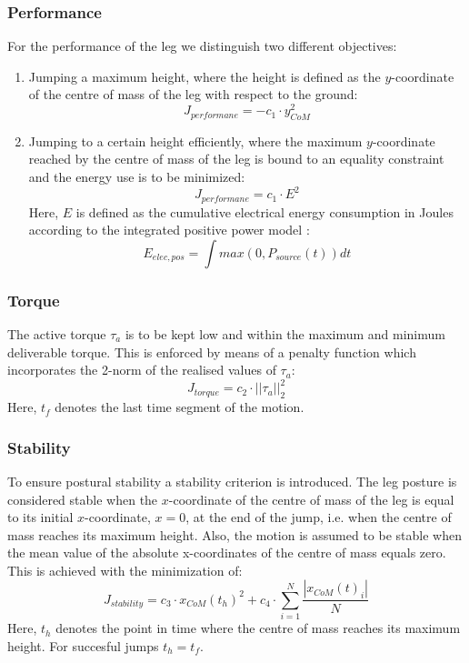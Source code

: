 \documentclass[letterpaper, 10 pt, conference]{ieeeconf}  %
\begin{document}
\subsubsection{Performance}
For the performance of the leg we distinguish two different objectives: 
\begin{enumerate}
	\item Jumping a maximum height, where the height is defined as the $y$-coordinate of the centre of mass of the leg with respect to the ground:
 \begin{equation}
	J_{performane} = -c_1 \cdot y_{CoM}^2
 \end{equation}
	\item Jumping to a certain height efficiently, where the maximum $y$-coordinate reached by the centre of mass of the leg is bound to an equality constraint and the energy use is to be minimized:
 \begin{equation}
	J_{performane} =  c_1 \cdot E^2
 \end{equation}
	Here, $E$ is defined as the cumulative electrical energy consumption in Joules according to the integrated positive power model \cite{verstraten2016energy}:
	 \begin{equation}
	E_{elec,pos} = \int max(0,P_{source}(t))dt
	\end{equation}
\end{enumerate}

\subsubsection{Torque}
The active torque $\tau_a$ is to be kept low and within the maximum and minimum deliverable torque. This is enforced by means of a penalty function which incorporates the 2-norm of the realised values of $\tau_a$:  
 \begin{equation}
J_{torque}= c_2 \cdot || \tau_a ||_2^2
 \end{equation}
Here, $t_f$ denotes the last time segment of the motion.\\

\subsubsection{Stability}
To ensure postural stability a stability criterion is introduced. The leg posture is considered stable when the $x$-coordinate of the centre of mass of the leg is equal to its initial $x$-coordinate, $x=0$, at the end of the jump, i.e. when the centre of mass reaches its maximum height. Also, the motion is assumed to be stable when the mean value of the absolute x-coordinates of the centre of mass equals zero. This is achieved with the minimization of:
 \begin{equation}
J_{stability}  = c_3\cdot x_{CoM}(t_h)^2 + c_4\cdot  \sum^{N}_{i=1}\frac{| x_{CoM}(t)_i |}{N}
 \end{equation}
Here, $t_h$ denotes the point in time where the centre of mass reaches its maximum height. For succesful jumps $t_h=t_f$.\\
\end{document}

